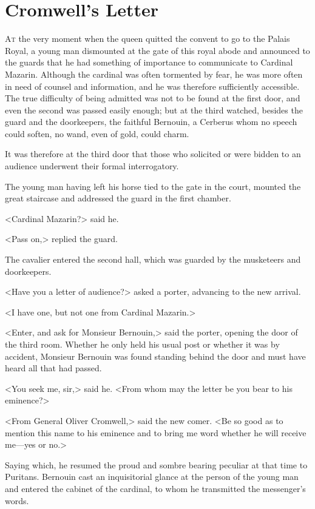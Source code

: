 \chapter{Cromwell's Letter}

 \lettrine{A}{t} the very moment when the queen quitted the convent to go to the Palais Royal, a young man dismounted at the gate of this royal abode and announced to the guards that he had something of importance to communicate to Cardinal Mazarin. Although the cardinal was often tormented by fear, he was more often in need of counsel and information, and he was therefore sufficiently accessible. The true difficulty of being admitted was not to be found at the first door, and even the second was passed easily enough; but at the third watched, besides the guard and the doorkeepers, the faithful Bernouin, a Cerberus whom no speech could soften, no wand, even of gold, could charm.

It was therefore at the third door that those who solicited or were bidden to an audience underwent their formal interrogatory.

The young man having left his horse tied to the gate in the court, mounted the great staircase and addressed the guard in the first chamber.

<Cardinal Mazarin?> said he.

<Pass on,> replied the guard.

The cavalier entered the second hall, which was guarded by the musketeers and doorkeepers.

<Have you a letter of audience?> asked a porter, advancing to the new arrival.

<I have one, but not one from Cardinal Mazarin.>

<Enter, and ask for Monsieur Bernouin,> said the porter, opening the door of the third room. Whether he only held his usual post or whether it was by accident, Monsieur Bernouin was found standing behind the door and must have heard all that had passed.

<You seek me, sir,> said he. <From whom may the letter be you bear to his eminence?>

<From General Oliver Cromwell,> said the new comer. <Be so good as to mention this name to his eminence and to bring me word whether he will receive me—yes or no.>

Saying which, he resumed the proud and sombre bearing peculiar at that time to Puritans. Bernouin cast an inquisitorial glance at the person of the young man and entered the cabinet of the cardinal, to whom he transmitted the messenger's words.

